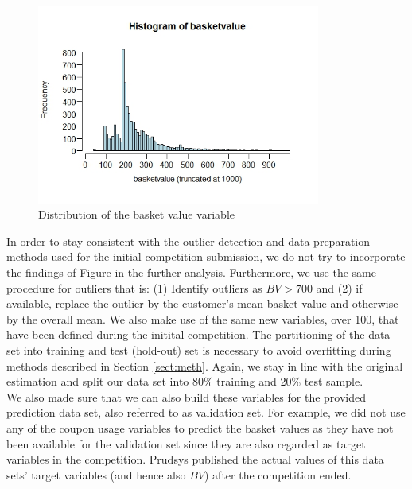 \documentclass[12pt]{article}
\begin{document}
\begin{figure}[H]
\centering
\includegraphics[width=0.83\textwidth]{histbasket.jpeg}
\vspace{-5pt}
\caption{Distribution of the basket value variable}
\label{fig:histbv}
\end{figure}
In order to stay consistent with the outlier detection and data preparation methods used for the initial competition submission, we do not try to incorporate the findings of Figure \label{ref:histbv} in the further analysis. Furthermore, we use the same procedure for outliers that is: (1) Identify outliers as $BV > 700$ and (2) if available, replace the outlier by the customer's mean basket value and otherwise by the overall mean.
We also make use of the same new variables, over 100, that have been defined during the initital competition.
The partitioning of the data set into training and test (hold-out) set is necessary to avoid overfitting during methods described in Section \ref{sect:meth}. Again, we stay in line with the original estimation and split our data set into 80\% training and 20\% test sample.\\

We also made sure that we can also build these variables for the provided prediction data set, also referred to as validation set. For example, we did not use any of the coupon usage variables to predict the basket values as they have not been available for the validation set since they are also regarded as target variables in the competition.
Prudsys published the actual values of this data sets' target variables (and hence also $BV$) after the competition ended.  
\end{document}

